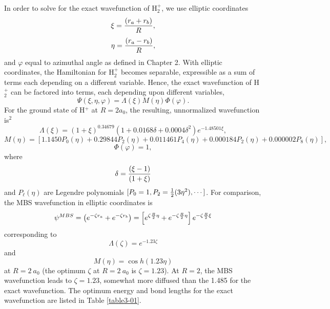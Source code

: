 In order to solve for the exact wavefunction of H$^+_2$, we use 
elliptic coordinates
\begin{equation}
\xi = {(r_a + r_b ) \over R} ,
\end{equation}
\begin{equation}
\eta = {(r_a - r_b ) \over R} ,
\end{equation}
and $\varphi$ equal to azimuthal angle as defined in 
Chapter 2.  With elliptic coordinates, the Hamiltonian for H$^+_2$ 
becomes separable, expressible as a sum of terms each depending on 
a different variable. Hence, the exact wavefunction of H$^+_2$ can be 
factored into terms, each depending upon different variables,
\begin{equation}
\Psi ( \xi , \eta , \varphi ) = \Lambda ( \xi ) M ( \eta ) \Phi ( 
\varphi) .
\end{equation}
For the ground state of H$^+$ at $R = 2a_0$, the resulting, unnormalized 
wavefunction is$^2$
\begin{equation}
\Lambda ( \xi ) = ( 1 + \xi )^{0.34679} ( 1 + 0.0168 \delta + 0.0004 
\delta^2 )e^{- 1.48501 \xi} ,
\end{equation}
\begin{equation}
M( \eta) = \left[ 1.1450P_0 (\eta) + 0.29844P_2(\eta) + 
0.011461P_4(\eta) + 0.000184P_2(\eta) + 0.000002P_8(\eta) \right] ,
\end{equation}
\begin{equation}
\Phi ( \varphi) = 1,
\end{equation}
where
\begin{equation}
\delta = { ( \xi - 1 ) \over ( 1 + \xi)}
\end{equation}
and $P_\ell ( \eta )$ are Legendre polynomials $[P_0 = 1 , P_2 = {1
\over 2} ( 3 \eta^2 ),\cdots]$.  For comparison, the MBS wavefunction
in elliptic coordinates is
\begin{equation}
\psi^{MBS} = \left( e^{- \zeta r_a} + e^{- \zeta r_b} \right) = 
\left[ e^{\zeta {R \over 2} \eta} + e^{- \zeta {R \over 2} \eta} 
\right] e^{- \zeta {R \over 2} \xi}
\end{equation}
corresponding to
\begin{equation}
\Lambda ( \zeta ) = e^{-1.23 \zeta}
\end{equation}
and
\begin{equation}
M( \eta ) = \cos h ( 1.23 \eta )
\end{equation}
at $R = 2\ a_0$ (the optimum $\zeta$ at $R = 2\ a_0$ is $\zeta =
1.23$).  At $R = 2$, the MBS wavefunction leads to $\zeta = 1.23$,
somewhat more diffused than the 1.485 for the exact wavefunction. The
optimum energy and bond lengths for the exact wavefunction are listed
in Table \ref{table3-01}.

